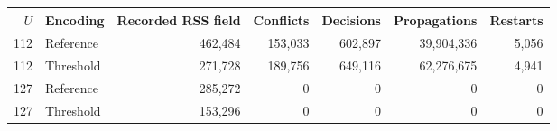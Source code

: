 \begin{tabular}{rlrrrrr}
\toprule
$U$ & Encoding & Recorded RSS field & Conflicts & Decisions & Propagations & Restarts \\
\midrule
112 & Reference & 462,484 & 153,033 & 602,897 & 39,904,336 & 5,056 \\
112 & Threshold & 271,728 & 189,756 & 649,116 & 62,276,675 & 4,941 \\
127 & Reference & 285,272 & 0 & 0 & 0 & 0 \\
127 & Threshold & 153,296 & 0 & 0 & 0 & 0 \\
\bottomrule
\end{tabular}
